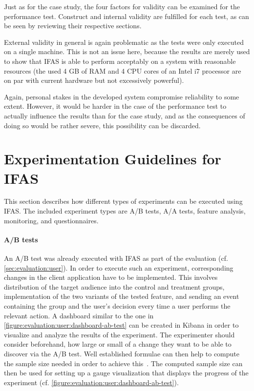 Just as for the case study, the four factors for validity can be examined for the performance test.
Construct and internal validity are fulfilled for each test, as can be seen by reviewing their respective sections.

External validity in general is again problematic as the tests were only executed on a single machine.
This is not an issue here, because the results are merely used to show that \ac{IFAS} is able to perform acceptably on a system with reasonable resources (the used 4 GB of RAM and 4 CPU cores of an Intel i7 processor are on par with current hardware but not excessively powerful).

Again, personal stakes in the developed system compromise reliability to some extent.
However, it would be harder in the case of the performance test to actually influence the results than for the case study, and as the consequences of doing so would be rather severe, this possibility can be discarded.

\section{Experimentation Guidelines for IFAS}

This section describes how different types of experiments can be executed using \ac{IFAS}.
The included experiment types are A/B tests, A/A tests, feature analysis, monitoring, and questionnaires.

\paragraph{A/B tests}
An A/B test was already executed with \ac{IFAS} as part of the evaluation (cf. \cref{sec:evaluation:user}).
In order to execute such an experiment, corresponding changes in the client application have to be implemented.
This involves distribution of the target audience into the control and treatment groups, implementation of the two variants of the tested feature, and sending an event containing the group and the user's decision every time a user performs the relevant action.
A dashboard similar to the one in \cref{figure:evaluation:user:dashboard-ab-test} can be created in Kibana in order to visualize and analyze the results of the experiment.
The experimenter should consider beforehand, how large or small of a change they want to be able to discover via the A/B test.
Well established formulae can then help to compute the sample size needed in order to achieve this~\cite{Kohavi2009,box2005statistics}.
The computed sample size can then be used for setting up a gauge visualization that displays the progress of the experiment (cf. \cref{figure:evaluation:user:dashboard-ab-test}).


